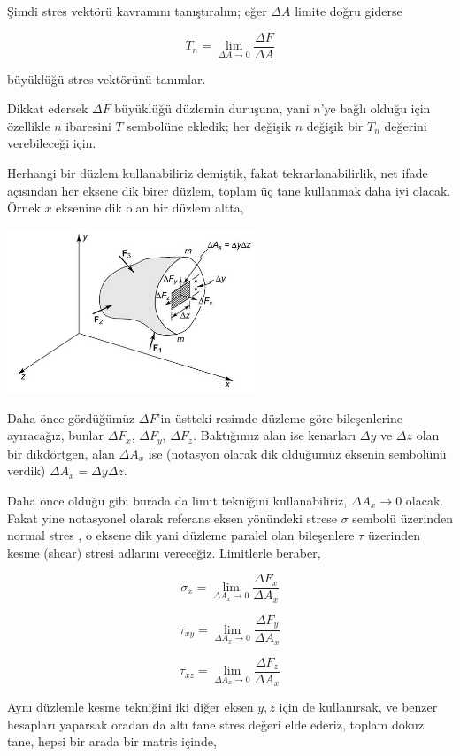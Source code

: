 \documentclass[12pt,fleqn]{article}\usepackage{../../common}
\begin{document}
Şimdi stres vektörü kavramını tanıştıralım; eğer $\Delta A$ limite doğru giderse

$$
T_n = \lim_{\Delta A \to 0} \frac{\Delta F}{\Delta A}
$$

büyüklüğü stres vektörünü tanımlar.

Dikkat edersek $\Delta F$ büyüklüğü düzlemin duruşuna, yani $n$'ye bağlı olduğu
için özellikle $n$ ibaresini $T$ sembolüne ekledik; her değişik $n$ değişik bir
$T_n$ değerini verebileceği için.

Herhangi bir düzlem kullanabiliriz demiştik, fakat tekrarlanabilirlik, net ifade
açısından her eksene dik birer düzlem, toplam üç tane kullanmak daha iyi
olacak. Örnek $x$ eksenine dik olan bir düzlem altta,

\includegraphics[width=20em]{phy_020_strs_02_18.jpg}

Daha önce gördüğümüz $\Delta F$'in üstteki resimde düzleme göre bileşenlerine
ayıracağız, bunlar $\Delta F_x$, $\Delta F_y$, $\Delta F_z$. Baktığımız alan ise
kenarları $\Delta y$ ve $\Delta z$ olan bir dikdörtgen, alan $\Delta A_x$ ise
(notasyon olarak dik olduğumüz eksenin sembolünü verdik)
$\Delta A_x = \Delta y \Delta z$.

Daha önce olduğu gibi burada da limit tekniğini kullanabiliriz, $\Delta A_x \to
0$ olacak. Fakat yine notasyonel olarak referans eksen yönündeki strese $\sigma$
sembolü üzerinden normal stres , o eksene dik yani düzleme paralel olan
bileşenlere $\tau$ üzerinden kesme (shear) stresi adlarını vereceğiz.
Limitlerle beraber,

$$
\sigma_x = \lim_{\Delta A_x \to 0 } \frac{\Delta F_x}{\Delta A_x}
$$

$$
\tau_{xy} = \lim_{\Delta A_x \to 0 } \frac{\Delta F_y}{\Delta A_x}
$$

$$
\tau_{xz} = \lim_{\Delta A_x \to 0 } \frac{\Delta F_z}{\Delta A_x}
$$

Aynı düzlemle kesme tekniğini iki diğer eksen $y,z$ için de kullanırsak, ve
benzer hesapları yaparsak oradan da altı tane stres değeri elde ederiz, toplam
dokuz tane, hepsi bir arada bir matris içinde,
\end{document}
